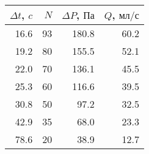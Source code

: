 \begin{tabular}{rrrr}
\toprule
$\Delta t$, $c$ & $N$ & $\Delta P$, $Па$ & $Q$, $мл/с$ \\
\midrule
16.6 & 93 & 180.8 & 60.2 \\
19.2 & 80 & 155.5 & 52.1 \\
22.0 & 70 & 136.1 & 45.5 \\
25.3 & 60 & 116.6 & 39.5 \\
30.8 & 50 & 97.2 & 32.5 \\
42.9 & 35 & 68.0 & 23.3 \\
78.6 & 20 & 38.9 & 12.7 \\
\bottomrule
\end{tabular}
